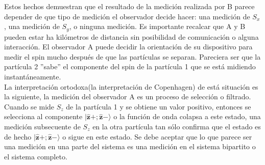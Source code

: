 \documentclass[a4paper]{article}
\begin{document}
Estos hechos demuestran que el resultado de la medición realizada por B parece depender de que tipo de medición el observador decide hacer: una medición de $S_x$, una medición de $S_y$, o ninguna medición. Es importante recalcar que A y B pueden estar ha kilómetros de distancia sin posibilidad de comunicación o alguna interacción. El observador A puede decidir la orientación de su dispositivo para medir el spin mucho después de que las partículas se separan. Pareciera ser que la partícula 2 ''sabe'' el componente del spin de la partícula 1 que se está midiendo instantáneamente. \\
La interpretación ortodoxa(la interpretación de Copenhagen) de está situación es la siguiente, la medición del observador A es un proceso de selección o filtrado. Cuando se mide $S_z$ de la partícula 1 y se obtiene un valor positivo, entonces se selecciona al componente $|\mathbf{\hat{z}}+;\mathbf{\hat{z}}-\rangle$ o la función de onda colapsa a este estado, una medición subsecuente de $S_z$ en la otra partícula tan sólo confirma que el estado es de hecho $|\mathbf{\hat{z}}+;\mathbf{\hat{z}}-\rangle$ o sigue en este estado. Se debe aceptar que lo que parece ser una medición en una parte del sistema es una medición en el sistema bipartito o el sistema completo.
\end{document}

